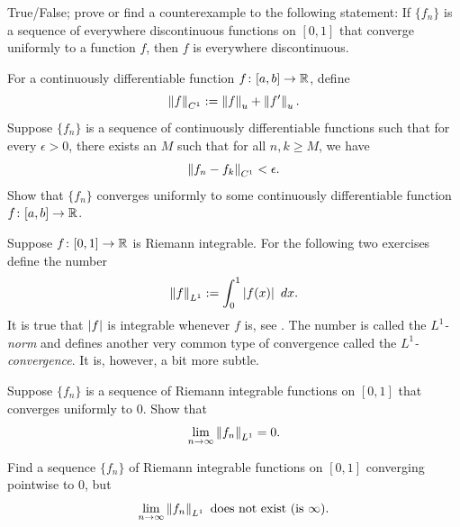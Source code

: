 \begin{exercise}
True/False; prove or find a counterexample to the following statement:
If $\{ f_n \}$ is a sequence of everywhere discontinuous functions on $[0,1]$
that converge uniformly to a function $f$, then $f$ is everywhere
discontinuous.
\end{exercise}

\begin{exercise} \label{c1uniflim:exercise}
For a continuously differentiable function $f \colon [a,b] \to {\mathbb{R}}$, define
\begin{equation*}
\left\lVert {f} \right\rVert_{C^1} := \left\lVert {f} \right\rVert_u + \left\lVert {f'} \right\rVert_u .
\end{equation*}
Suppose $\{ f_n \}$ is a sequence of continuously differentiable
functions such that for every $\epsilon >0$, there exists an $M$
such that for all $n,k \geq M$, we have
\begin{equation*}
\left\lVert {f_n-f_k} \right\rVert_{C^1} < \epsilon .
\end{equation*}
Show that $\{ f_n \}$ converges uniformly to some continuously differentiable
function $f \colon [a,b] \to {\mathbb{R}}$.
\end{exercise}

\begin{exnote}
Suppose 
$f \colon [0,1] \to {\mathbb{R}}$ is Riemann integrable.
For the following two exercises define 
the number
\begin{equation*}
\left\lVert {f} \right\rVert_{L^1} := 
\int_0^1 \left\lvert {f(x)} \right\rvert~dx .
\end{equation*}
It is true that $\left\lvert {f} \right\rvert$ is integrable whenever $f$ is, see
.
The number is called the \emph{$L^1$-norm} and
defines another very common type of
convergence called the
\emph{$L^1$-convergence}.
It is, however, a bit more subtle.
\end{exnote}

\begin{exercise}
Suppose $\{ f_n \}$ is a sequence of Riemann integrable functions on $[0,1]$
that converges uniformly
to $0$.  Show that
\begin{equation*}
\lim_{n\to\infty} \left\lVert {f_n} \right\rVert_{L^1} = 0 .
\end{equation*}
\end{exercise}

\begin{exercise}
Find a sequence $\{ f_n \}$ of Riemann integrable functions 
on $[0,1]$ converging pointwise to $0$, but
\begin{equation*}
\lim_{n\to\infty} \left\lVert {f_n} \right\rVert_{L^1} \text{ does not exist (is } \infty\text{)}.
\end{equation*}
\end{exercise}

